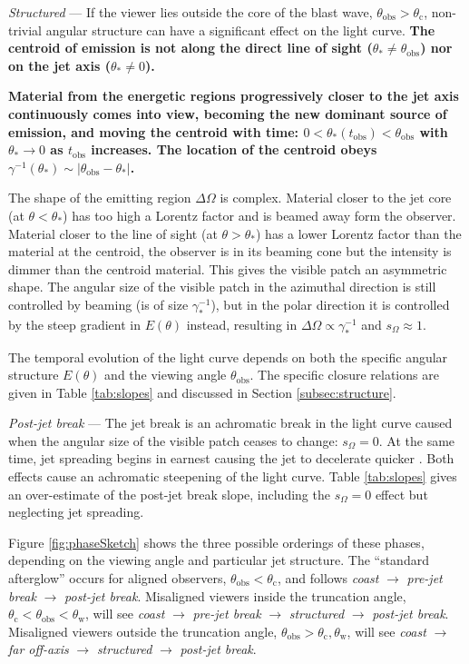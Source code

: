 \documentclass[twocolumn]{aastex62}
\newcommand{\tobs}{\ensuremath{t_{\mathrm{obs}}}}
\newcommand{\thobs}{\ensuremath{\theta_{\mathrm{obs}}}}
\newcommand{\thW}{\ensuremath{\theta_{\mathrm{w}}}}
\newcommand{\thC}{\ensuremath{\theta_{\mathrm{c}}}}
\newcommand{\som}{\ensuremath{s_{\Omega}}}
\begin{document}
\emph{Structured} --- If the viewer lies outside the core of the blast wave, $\thobs > \thC$, non-trivial angular structure can have a significant effect on the light curve.  {\bf The centroid of emission is not along the direct line of sight ($\theta_* \neq \thobs$) nor on the jet axis ($\theta_* \neq 0$).}  {\bf Material from the energetic regions progressively closer to the jet axis continuously comes into view, becoming the new dominant source of emission, and moving the centroid with time: $0 < \theta_*(\tobs) < \thobs$  with $\theta_* \to 0$ as $\tobs$ increases. The location of the centroid obeys $\gamma^{-1}(\theta_*) \sim |\thobs-\theta_*|$.  

The shape of the emitting region $\Delta \Omega$ is complex.  Material closer to the jet core (at $\theta < \theta_*$) has too high a Lorentz factor and is beamed away form the observer.  Material closer to the line of sight (at $\theta > \theta_*$) has a lower Lorentz factor than the material at the centroid, the observer is in its beaming cone but the intensity is dimmer than the centroid material.  This gives the visible patch an asymmetric shape.  The angular size of the visible patch in the azimuthal direction is still controlled by beaming (is of size $\gamma_*^{-1}$), but in the polar direction it is controlled by the steep gradient in $E(\theta)$ instead, resulting in $\Delta \Omega \propto \gamma_*^{-1}$ and $\som \approx 1$.}  The temporal evolution of the light curve depends on both the specific angular structure $E(\theta)$ and the viewing angle $\thobs$. The specific closure relations are given in Table \ref{tab:slopes} and discussed in Section \ref{subsec:structure}.

\emph{Post-jet break} --- The jet break is an achromatic break in the light curve caused when the angular size of the visible patch ceases to change: $\som = 0$.  At the same time, jet spreading begins in earnest causing the jet to decelerate quicker \citep{Rhoads:1999aa}.  Both effects cause an achromatic steepening of the light curve.  Table \ref{tab:slopes} gives an over-estimate of the post-jet break slope, including the $\som=0$ effect but neglecting jet spreading.


Figure \ref{fig:phaseSketch} shows the three possible orderings of these phases, depending on the viewing angle and particular jet structure.  The ``standard afterglow'' occurs for aligned observers, $\thobs < \thC$, and follows \emph{coast} $\to$ \emph{pre-jet break} $\to$ \emph{post-jet break}.  Misaligned viewers inside the truncation angle, $\thC < \thobs < \thW$, will see \emph{coast} $\to$ \emph{pre-jet break} $\to$ \emph{structured} $\to$ \emph{post-jet break}.  Misaligned viewers outside the truncation angle, $\thobs > \thC, \thW$, will see \emph{coast} $\to$ \emph{far off-axis} $\to$ \emph{structured} $\to$ \emph{post-jet break}.
\end{document}
